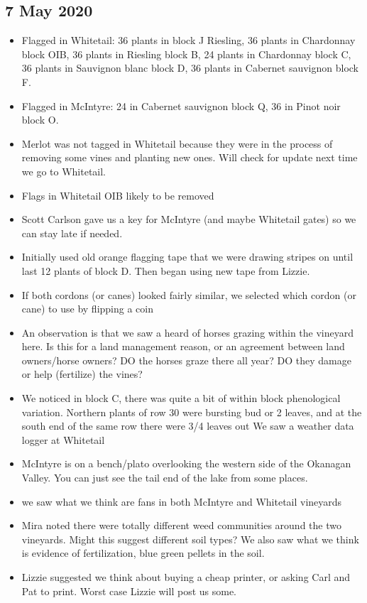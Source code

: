 \documentclass[11pt,letter]{article}
\newenvironment{smitemize}{
\begin{itemize}
  \setlength{\itemsep}{0pt}
  \setlength{\parskip}{0.8pt}
  \setlength{\parsep}{0pt}}
{\end{itemize}
}
\begin{document}
\subsection{7 May 2020}
\begin{smitemize}
\item Flagged in Whitetail: 36 plants in block J Riesling, 36 plants in Chardonnay block OIB, 36 plants in Riesling block B, 24 plants in Chardonnay block C, 36 plants in Sauvignon blanc block D, 36 plants in Cabernet sauvignon block F.
\item Flagged in McIntyre: 24 in Cabernet sauvignon block Q, 36 in Pinot noir block O.
\item Merlot was not tagged in Whitetail because they were in the process of removing some vines and planting new ones. Will check for update next time we go to Whitetail.
\item Flags in Whitetail OIB likely to be removed
\item Scott Carlson gave us a key for McIntyre (and maybe Whitetail gates) so we can stay late if needed.
\item Initially used old orange flagging tape that we were drawing stripes on until last 12 plants of block D. Then began using new tape from Lizzie.
\item If both cordons (or canes) looked fairly similar, we selected which cordon (or cane) to use by flipping a coin
\item An observation is that we saw a heard of horses grazing within the vineyard here. Is this for a land management reason, or an agreement between land owners/horse owners? DO the horses graze there all year? DO they damage or help (fertilize) the vines? 
\item We noticed in block C, there was quite a bit of within block phenological variation. Northern plants of row 30 were bursting bud or 2 leaves, and at the south end of the same row there were 3/4 leaves out
We saw a weather data logger at Whitetail 
\item McIntyre is on a bench/plato overlooking the western side of the Okanagan Valley. You can just see the tail end of the lake from some places.
\item we saw what we think are fans in both McIntyre and Whitetail vineyards 
\item Mira noted there were totally different weed communities around the two vineyards. Might this suggest different soil types? We also saw what we think is evidence of fertilization, blue green pellets in the soil.
\item Lizzie suggested we think about buying a cheap printer, or asking Carl and Pat to print. Worst case Lizzie will post us some. 


\end{smitemize}
\end{document}
